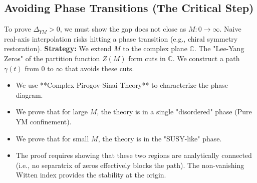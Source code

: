 \subsection{Avoiding Phase Transitions (The Critical Step)}
To prove $\Delta_{YM} > 0$, we must show the gap does not close as $M: 0 \to \infty$. 
Naive real-axis interpolation risks hitting a phase transition (e.g., chiral symmetry restoration).
\textbf{Strategy:} We extend $M$ to the complex plane $\mathbb{C}$. The "Lee-Yang Zeros" of the partition function $Z(M)$ form cuts in $\mathbb{C}$.
We construct a path $\gamma(t)$ from $0$ to $\infty$ that avoids these cuts.
\begin{itemize}
    \item We use **Complex Pirogov-Sinai Theory** to characterize the phase diagram.
    \item We prove that for large $M$, the theory is in a single "disordered" phase (Pure YM confinement).
    \item We prove that for small $M$, the theory is in the "SUSY-like" phase.
    \item The proof requires showing that these two regions are analytically connected (i.e., no separatrix of zeros effectively blocks the path). The non-vanishing Witten index provides the stability at the origin.
\end{itemize}

